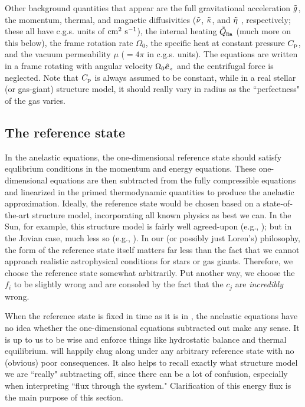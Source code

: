 \documentclass[12pt]{article}
\numberwithin{equation}{section}
\begin{document}
	Other background quantities that appear are the full gravitational acceleration $\tilde{g}$, the momentum, thermal, and magnetic diffusivities ($\tilde{\nu}$, $\tilde{\kappa}$, and $\tilde{\eta}$ , respectively; these all have c.g.s. units of $\rm{cm^2\ s^{-1}}$), the internal heating $\tilde{Q}_{\texttt{Ra}}$ (much more on this below), the frame rotation rate $\Omega_0$, the specific heat at constant pressure $C_{\rm{p}}$, and the vacuum permeability $\mu$ ($=4\pi$ in c.g.s. units). The equations are written in a frame rotating with angular velocity $\Omega_0\hat{\bm{e}}_z$ and the centrifugal force is neglected. Note that $C_{\rm{p}}$ is always assumed to be constant, while in a real stellar (or gas-giant) structure model, it should really vary in radius as the ``perfectness" of the gas varies. 
	
	\subsection{The reference state}\label{sec:ref}
	In the anelastic equations, the one-dimensional reference state should satisfy equlibrium conditions in the momentum and energy equations. These one-dimensional equations are then subtracted from the fully compressible equations and linearized in the primed thermodynamic quantities to produce the anelastic approximation. Ideally, the reference state would be chosen based on a state-of-the-art structure model, incorporating all known physics as best we can. In the Sun, for example, this structure model is fairly well agreed-upon (e.g., \citealt{ChristensenDalsgaard1996}); but in the Jovian case, much less so (e.g., \citealt{Guillot2005}). In our (or possibly just Loren's) philosophy, the form of the reference state itself matters far less than the fact that we cannot approach realistic astrophysical conditions for stars or gas giants. Therefore, we choose the reference state somewhat arbitrarily. Put another way, we choose the $f_i$ to be slightly wrong and are consoled by the fact that the $c_j$ are \textit{incredibly} wrong. 
	
	When the reference state is fixed in time as it is in {\rayleigh}, the anelastic equations have no idea whether the one-dimensional equations subtracted out make any sense. It is up to us to be wise and enforce things like hydrostatic balance and thermal equilibrium. {\rayleigh} will happily chug along under any arbitrary reference state with no (obvious) poor consequences. It also helps to recall exactly what structure model we are ``really" subtracting off, since there can be a lot of confusion, especially when interpreting ``flux through the system." Clarification of this energy flux is the main purpose of this section. 
	
\end{document}
